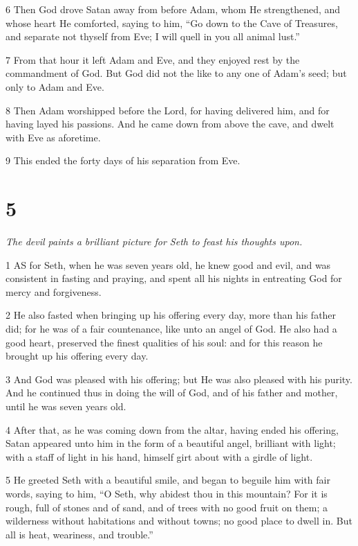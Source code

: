 \par 6 Then God drove Satan away from before Adam, whom He strengthened, and whose heart He comforted, saying to him, “Go down to the Cave of Treasures, and separate not thyself from Eve; I will quell in you all animal lust.”

\par 7 From that hour it left Adam and Eve, and they enjoyed rest by the commandment of God. But God did not the like to any one of Adam's seed; but only to Adam and Eve.

\par 8 Then Adam worshipped before the Lord, for having delivered him, and for having layed his passions. And he came down from above the cave, and dwelt with Eve as aforetime.

\par 9 This ended the forty days of his separation from Eve.

\chapter{5}

\par \textit{The devil paints a brilliant picture for Seth to feast his thoughts upon.}

\par 1 AS for Seth, when he was seven years old, he knew good and evil, and was consistent in fasting and praying, and spent all his nights in entreating God for mercy and forgiveness.

\par 2 He also fasted when bringing up his offering every day, more than his father did; for he was of a fair countenance, like unto an angel of God. He also had a good heart, preserved the finest qualities of his soul: and for this reason he brought up his offering every day.

\par 3 And God was pleased with his offering; but He was also pleased with his purity. And he continued thus in doing the will of God, and of his father and mother, until he was seven years old.

\par 4 After that, as he was coming down from the altar, having ended his offering, Satan appeared unto him in the form of a beautiful angel, brilliant with light; with a staff of light in his hand, himself girt about with a girdle of light.

\par 5 He greeted Seth with a beautiful smile, and began to beguile him with fair words, saying to him, “O Seth, why abidest thou in this mountain? For it is rough, full of stones and of sand, and of trees with no good fruit on them; a wilderness without habitations and without towns; no good place to dwell in. But all is heat, weariness, and trouble.”

